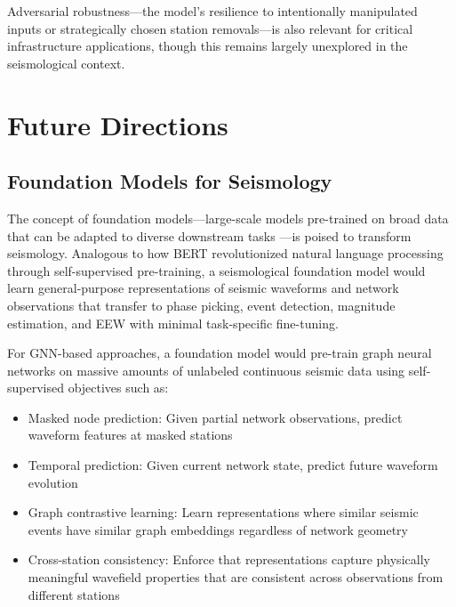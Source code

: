 \documentclass[review,authoryear]{elsarticle}
\begin{document}
Adversarial robustness---the model's resilience to intentionally manipulated inputs or strategically chosen station removals---is also relevant for critical infrastructure applications, though this remains largely unexplored in the seismological context.


\section{Future Directions}
\label{sec:future}

\subsection{Foundation Models for Seismology}

The concept of foundation models---large-scale models pre-trained on broad data that can be adapted to diverse downstream tasks \citep{bommasani2021opportunities}---is poised to transform seismology. Analogous to how BERT \citep{devlin2019bert} revolutionized natural language processing through self-supervised pre-training, a seismological foundation model would learn general-purpose representations of seismic waveforms and network observations that transfer to phase picking, event detection, magnitude estimation, and EEW with minimal task-specific fine-tuning.

For GNN-based approaches, a foundation model would pre-train graph neural networks on massive amounts of unlabeled continuous seismic data using self-supervised objectives such as:
\begin{itemize}
  \item Masked node prediction: Given partial network observations, predict waveform features at masked stations
  \item Temporal prediction: Given current network state, predict future waveform evolution
  \item Graph contrastive learning: Learn representations where similar seismic events have similar graph embeddings regardless of network geometry
  \item Cross-station consistency: Enforce that representations capture physically meaningful wavefield properties that are consistent across observations from different stations
\end{itemize}
\end{document}
